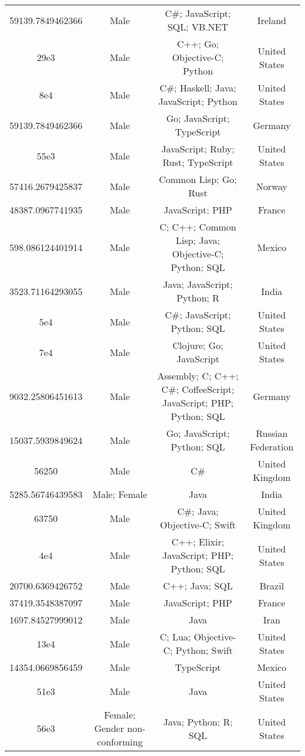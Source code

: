 \begin{center}
\begin{tabular}{ |c|c|c|c| }
59139.7849462366  &  Male  &  C\#; JavaScript; SQL; VB.NET  &  Ireland  \\ 
29e3  &  Male  &  C++; Go; Objective-C; Python  &  United States  \\ 
8e4  &  Male  &  C\#; Haskell; Java; JavaScript; Python  &  United States  \\ 
59139.7849462366  &  Male  &  Go; JavaScript; TypeScript  &  Germany  \\ 
55e3  &  Male  &  JavaScript; Ruby; Rust; TypeScript  &  United States  \\ 
57416.2679425837  &  Male  &  Common Lisp; Go; Rust  &  Norway  \\ 
48387.0967741935  &  Male  &  JavaScript; PHP  &  France  \\ 
598.086124401914  &  Male  &  C; C++; Common Lisp; Java; Objective-C; Python; SQL  &  Mexico  \\ 
3523.71164293055  &  Male  &  Java; JavaScript; Python; R  &  India  \\ 
5e4  &  Male  &  C\#; JavaScript; Python; SQL  &  United States  \\ 
7e4  &  Male  &  Clojure; Go; JavaScript  &  United States  \\ 
9032.25806451613  &  Male  &  Assembly; C; C++; C\#; CoffeeScript; JavaScript; PHP; Python; SQL  &  Germany  \\ 
15037.5939849624  &  Male  &  Go; JavaScript; Python; SQL  &  Russian Federation  \\ 
56250  &  Male  &  C\#  &  United Kingdom  \\ 
5285.56746439583  &  Male; Female  &  Java  &  India  \\ 
63750  &  Male  &  C\#; Java; Objective-C; Swift  &  United Kingdom  \\ 
4e4  &  Male  &  C++; Elixir; JavaScript; PHP; Python; SQL  &  United States  \\ 
20700.6369426752  &  Male  &  C++; Java; SQL  &  Brazil  \\ 
37419.3548387097  &  Male  &  JavaScript; PHP  &  France  \\ 
1697.84527999012  &  Male  &  Java  &  Iran  \\ 
13e4  &  Male  &  C; Lua; Objective-C; Python; Swift  &  United States  \\ 
14354.0669856459  &  Male  &  TypeScript  &  Mexico  \\ 
51e3  &  Male  &  Java  &  United States  \\ 
56e3  &  Female; Gender non-conforming  &  Java; Python; R; SQL  &  United States  \\ 

\end{tabular}
\end{center}

